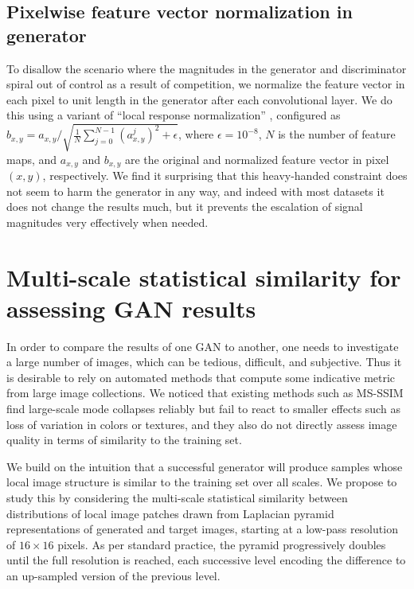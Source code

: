 \subsection{Pixelwise feature vector normalization in generator}
\label{sec:featurenorm}

To disallow the scenario where the magnitudes in the generator and discriminator spiral out of control as a result of competition, we normalize the feature vector in each pixel to unit length in the generator after each convolutional layer. We do this using a variant of ``local response normalization'' \citep{Krizhevsky2012}, configured as $b_{x,y} = a_{x,y} / \sqrt{\frac{1}{N} \sum_{j=0}^{N-1} (a^j_{x,y})^2 + \epsilon}$,
where $\epsilon=10^{-8}$, $N$ is the number of feature maps, and $a_{x,y}$ and $b_{x,y}$ are the original and normalized feature vector in pixel $(x,y)$, respectively. We find it surprising that this heavy-handed  constraint does not seem to harm the generator in any way, and indeed with most datasets it does not change the results much, but it prevents the escalation of signal magnitudes very effectively when needed.

\section{Multi-scale statistical similarity for assessing GAN results}
\label{sec:metric}

In order to compare the results of one GAN to another, one needs to investigate a large number of images, which can be tedious, difficult, and subjective. Thus it is desirable to rely on automated methods that compute some indicative metric from large image collections. We noticed that existing methods such as MS-SSIM \citep{Odena2017} find large-scale mode collapses reliably but fail to react to smaller effects such as loss of variation in colors or textures, and they also do not directly assess image quality in terms of similarity to the training set.

We build on the intuition that a successful generator will produce samples whose {local image structure is similar to the training set over all scales}. We propose to study this by considering the multi-scale statistical similarity between distributions of local image patches drawn from Laplacian pyramid \citep{Burt1987} representations of generated and target images, starting at a low-pass resolution of $16\times 16$ pixels. As per standard practice, the pyramid progressively doubles until the full resolution is reached, each successive level encoding the difference to an up-sampled version of the previous level.

